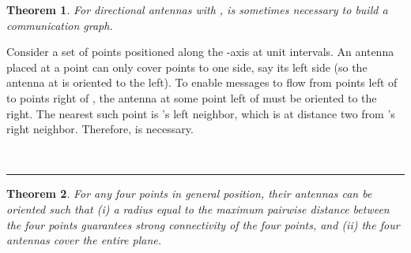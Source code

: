 \documentclass[11pt]{article}
\newtheorem{theorem}{Theorem}
\newcommand{\qed}{\rule{0.5em}{1.5ex}}
\newcommand{\fqed}{{\hfill~\qed}}
\newenvironment{proof}{{\noindent \bf Proof.}}
                      {{\hfill \fqed} \vspace{1em}}
\begin{document}
\begin{theorem}
For directional antennas with ,  is
sometimes necessary to build a communication graph.
\end{theorem}
\begin{proof}
Consider a set of points positioned along the -axis
at unit intervals.
An antenna placed at a point  can only cover points to one side,
say its left side (so the antenna at  is oriented to the left).
To enable messages to flow from points left of  to points
right of , the antenna at some point left of  must be oriented
to the right. The nearest such point is 's left neighbor, which
is at distance two from 's right neighbor.
Therefore,  is necessary.
\end{proof}


\begin{theorem}
For any four points in general position, their antennas
can be oriented such that (i) a radius equal to the maximum pairwise
distance between the four points guarantees strong connectivity
of the four points, and (ii) the four antennas cover the entire plane.
\label{thm:fourpoints}
\end{theorem}
\end{document}
